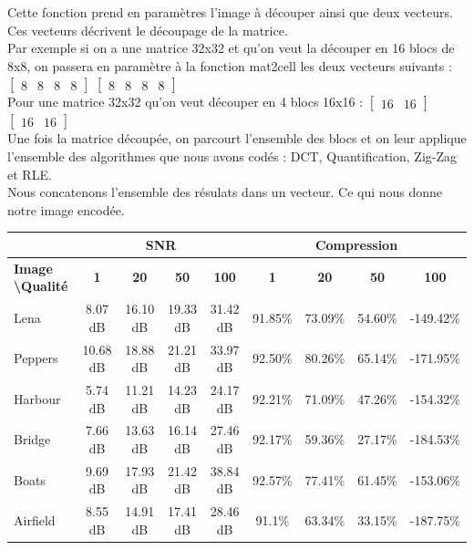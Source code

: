 \documentclass[a4paper, 12pt]{article}
\begin{document}
Cette fonction prend en paramètres l'image à découper ainsi que deux vecteurs. Ces vecteurs décrivent le découpage de la matrice. \\
Par exemple si on a une matrice 32x32 et qu'on veut la découper en 16 blocs de 8x8, on passera en paramètre à la fonction mat2cell les deux vecteurs suivants : \\
$\begin{bmatrix}
   8 & 8 & 8 & 8
\end{bmatrix}$
$\begin{bmatrix}
   8 & 8 & 8 & 8
\end{bmatrix}$ \\
Pour une matrice 32x32 qu'on veut découper en 4 blocs 16x16 :
$\begin{bmatrix}
   16 & 16
\end{bmatrix}$
$\begin{bmatrix}
   16 & 16
\end{bmatrix}$ \\
Une fois la matrice découpée, on parcourt l'ensemble des blocs et on leur applique l'ensemble des algorithmes que nous avons codés : DCT, Quantification, Zig-Zag et RLE.\\
Nous concatenons l'ensemble des résulats dans un vecteur. Ce qui nous donne notre image encodée.

\begin{center}
	\footnotesize
	\begin{tabular}{|l|c|c|c|c||c|c|c|c|}
		\hline
		& \multicolumn{4}{c||}{\bf SNR} & \multicolumn{4}{c|}{\bf Compression} \\
		\hline
		\bf Image \textbackslash Qualité &        \bf 1 &        \bf 20 &        \bf 50 &        \bf 100 &       \bf 1 &       \bf 20 &       \bf 50 &         \bf 100 \\
		\hline
		Lena                                        &      8.07 dB &      16.10 dB &      19.33 dB &       31.42 dB &     91.85\% &      73.09\% &      54.60\% &       -149.42\% \\
		\hline
		Peppers                                     &     10.68 dB &      18.88 dB &      21.21 dB &       33.97 dB &     92.50\% &      80.26\% &      65.14\% &       -171.95\% \\
		\hline
		Harbour                                     &      5.74 dB &      11.21 dB &      14.23 dB &       24.17 dB &     92.21\% &      71.09\% &      47.26\% &       -154.32\% \\
		\hline
		Bridge                                      &      7.66 dB &      13.63 dB &      16.14 dB &       27.46 dB &     92.17\% &      59.36\% &      27.17\% &       -184.53\% \\
		\hline
		Boats                                       &      9.69 dB &      17.93 dB &      21.42 dB &       38.84 dB &     92.57\% &      77.41\% &      61.45\% &       -153.06\% \\
		\hline
		Airfield                                    &      8.55 dB &      14.91 dB &      17.41 dB &       28.46 dB &      91.1\% &      63.34\% &      33.15\% &       -187.75\% \\
		\hline
	\end{tabular}
\end{center}
\end{document}
